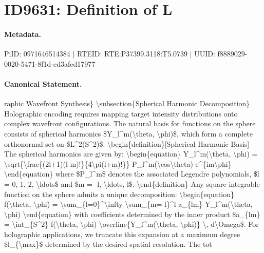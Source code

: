\section*{ID9631: Definition of L}
\paragraph{Metadata.}
PiID: 0971646514384 | RTEID: RTE:P37399.3118:T5.0739 | UUID: f8889029-0020-5471-8f1d-cd3afed17977

\paragraph{Canonical Statement.}
raphic Wavefront Synthesis\} \textbackslash{}subsection\{Spherical Harmonic Decomposition\} Holographic encoding requires mapping target intensity distributions onto complex wavefront configurations. The natural basis for functions on the sphere consists of spherical harmonics \$Y\_l\textasciicircum{}m(\textbackslash{}theta, \textbackslash{}phi)\$, which form a complete orthonormal set on \$L\textasciicircum{}2(S\textasciicircum{}2)\$. \textbackslash{}begin\{definition\}[Spherical Harmonic Basis] The spherical harmonics are given by: \textbackslash{}begin\{equation\} Y\_l\textasciicircum{}m(\textbackslash{}theta, \textbackslash{}phi) = \textbackslash{}sqrt\{\textbackslash{}frac\{(2l+1)(l-m)!\}\{4\textbackslash{}pi(l+m)!\}\} P\_l\textasciicircum{}m(\textbackslash{}cos\textbackslash{}theta) e\textasciicircum{}\{im\textbackslash{}phi\} \textbackslash{}end\{equation\} where \$P\_l\textasciicircum{}m\$ denotes the associated Legendre polynomials, \$l = 0, 1, 2, \textbackslash{}ldots\$ and \$m = -l, \textbackslash{}ldots, l\$. \textbackslash{}end\{definition\} Any square-integrable function on the sphere admits a unique decomposition: \textbackslash{}begin\{equation\} f(\textbackslash{}theta, \textbackslash{}phi) = \textbackslash{}sum\_\{l=0\}\textasciicircum{}\textbackslash{}infty \textbackslash{}sum\_\{m=-l\}\textasciicircum{}l a\_\{lm\} Y\_l\textasciicircum{}m(\textbackslash{}theta, \textbackslash{}phi) \textbackslash{}end\{equation\} with coefficients determined by the inner product \$a\_\{lm\} = \textbackslash{}int\_\{S\textasciicircum{}2\} f(\textbackslash{}theta, \textbackslash{}phi) \textbackslash{}overline\{Y\_l\textasciicircum{}m(\textbackslash{}theta, \textbackslash{}phi)\} \textbackslash{}, d\textbackslash{}Omega\$. For holographic applications, we truncate this expansion at a maximum degree \$l\_\{\textbackslash{}max\}\$ determined by the desired spatial resolution. The tot

